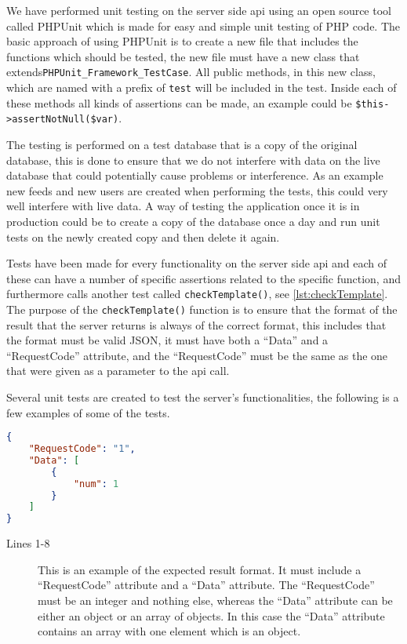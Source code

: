 We have performed unit testing on the server side \ac{api} using an open source tool called PHPUnit which is made for easy and simple unit testing of PHP code. The basic approach of using PHPUnit is to create a new file that includes the functions which should be tested, the new file must have a new class that extends\linebreak \lstinline|PHPUnit_Framework_TestCase|. All public methods, in this new class, which are named with a prefix of \lstinline|test| will be included in the test. Inside each of these methods all kinds of assertions can be made, an example could be \lstinline|$this->assertNotNull($var)|\citep{phpunit}.

The testing is performed on a test database that is a copy of the original database, this is done to ensure that we do not interfere with data on the live database that could potentially cause problems or interference. As an example new feeds and new users are created when performing the tests, this could very well interfere with live data. A way of testing the application once it is in production could be to create a copy of the database once a day and run unit tests on the newly created copy and then delete it again.

Tests have been made for every functionality on the server side \ac{api} and each of these can have a number of specific assertions related to the specific function, and furthermore calls another test called \lstinline|checkTemplate()|, see \autoref{lst:checkTemplate}. The purpose of the \lstinline|checkTemplate()| function is to ensure that the format of the result that the server returns is always of the correct format, this includes that the format must be valid JSON, it must have both a ``Data'' and a ``RequestCode'' attribute, and the ``RequestCode'' must be the same as the one that were given as a parameter to the \ac{api} call.

Several unit tests are created to test the server's functionalities, the following is a few examples of some of the tests.

\begin{lstlisting}[language=json, label=lst:jsonFormat, caption={JSON format, in this case an example of the result from \lstinline|CheckFeeds|}]
{
    "RequestCode": "1",
    "Data": [
        {
            "num": 1
        }
    ]
}
\end{lstlisting}
\begin{description}
\item[Lines 1-8] This is an example of the expected result format. It must include a ``RequestCode'' attribute and a ``Data'' attribute. The ``RequestCode'' must be an integer and nothing else, whereas the ``Data'' attribute can be either an object or an array of objects. In this case the ``Data'' attribute contains an array with one element which is an object.
\end{description}

